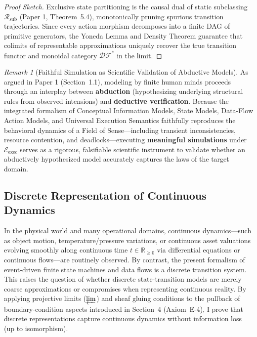 \documentclass[11pt,a4paper]{article}
\theoremstyle{definition}
\theoremstyle{plain}
\theoremstyle{remark}
\newtheorem{remark}{Remark}[section]
\newcommand{\DF}{\mathcal{DF}}
\begin{document}
\begin{proof}[Proof Sketch]
Exclusive state partitioning is the causal dual of static subclassing $\mathcal{R}_{\mathrm{sub}}$ (Paper 1, Theorem~5.4), monotonically pruning spurious transition trajectories. Since every action morphism decomposes into a finite DAG of primitive generators, the Yoneda Lemma and Density Theorem guarantee that colimits of representable approximations uniquely recover the true transition functor and monoidal category $\DF^*$ in the limit.
\end{proof}

\begin{remark}[Faithful Simulation as Scientific Validation of Abductive Models]\label{rem:simulation}
As argued in Paper 1 (Section~1.1), modeling by finite human minds proceeds through an interplay between \textbf{abduction} (hypothesizing underlying structural rules from observed intensions) and \textbf{deductive verification}. Because the integrated formalism of Conceptual Information Models, State Models, Data-Flow Action Models, and Universal Execution Semantics faithfully reproduces the behavioral dynamics of a Field of Sense---including transient inconsistencies, resource contention, and deadlocks---executing \textbf{meaningful simulations} under $\mathcal{E}_{\mathrm{exec}}$ serves as a rigorous, falsifiable scientific instrument to validate whether an abductively hypothesized model accurately captures the laws of the target domain.
\end{remark}

\subsection{Discrete Representation of Continuous Dynamics}\label{sec:continuous}
In the physical world and many operational domains, continuous dynamics---such as object motion, temperature/pressure variations, or continuous asset valuations evolving smoothly along continuous time $t \in \mathbb{R}_{\ge 0}$ via differential equations or continuous flows---are routinely observed. By contrast, the present formalism of event-driven finite state machines and data flows is a discrete transition system. This raises the question of whether discrete state-transition models are merely coarse approximations or compromises when representing continuous reality. By applying projective limits ($\varprojlim$) and sheaf gluing conditions to the pullback of boundary-condition aspects introduced in Section~4 (Axiom~E-4), I prove that discrete representations capture continuous dynamics without information loss (up to isomorphism).
\end{document}
